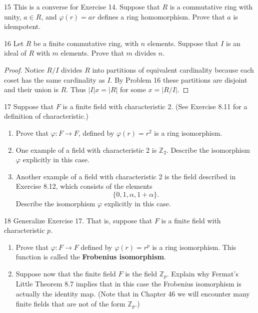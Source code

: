 \begin{problem}{15}
    This is a converse for Exercise 14. Suppose that $R$ is a commutative ring with
    unity, $a \in R$, and $\varphi(r) = ar$ defines a ring homomorphism. Prove that $a$
    is idempotent.
\end{problem}
\unsolved

\begin{problem}{16}
    Let $R$ be a finite commutative ring, with $n$ elements.
    Suppose that $I$ is an ideal of $R$ with $m$ elements.
    Prove that $m$ divides $n$.
\end{problem}
\solved

\begin{proof}
    Notice $R / I$ divides $R$ into partitions 
        of equivalent cardinality because each coset has the same cardinality as $I$.
    By Problem 16 these partitions are disjoint and their union is $R$.
    Thus $|I| x = |R|$ for some $x = |R/I|$.
\end{proof}

\begin{problem}{17}
    Suppose that $F$ is a finite field with characteristic 2. (See Exercise 8.11 for a
    definition of characteristic.)
    \begin{enumerate}
        \item[(a)] Prove that $\varphi : F \to F$, defined by $\varphi(r) = r^2$ is a ring
        isomorphism.
        \item[(b)] One example of a field with characteristic 2 is $\mathbb{Z}_2$.
        Describe the isomorphism $\varphi$ explicitly in this case.
        \item[(c)] Another example of a field with characteristic 2 is the field described
        in Exercise 8.12, which consists of the elements
        \[\{0, 1, \alpha, 1 + \alpha\}.\]
        Describe the isomorphism $\varphi$ explicitly in this case.
    \end{enumerate}
\end{problem}
\unsolved

\begin{problem}{18}
    Generalize Exercise 17. That is, suppose that $F$ is a finite field with
    characteristic $p$.
    \begin{enumerate}
        \item[(a)] Prove that $\varphi : F \to F$ defined by $\varphi(r) = r^p$ is a ring
        isomorphism. This function is called the \textbf{Frobenius isomorphism}.
        \item[(b)] Suppose now that the finite field $F$ is the field $\mathbb{Z}_p$.
        Explain why Fermat's Little Theorem 8.7 implies that in this case the Frobenius
        isomorphism is actually the identity map. (Note that in Chapter 46 we will
        encounter many finite fields that are not of the form $\mathbb{Z}_p$.)
    \end{enumerate}
\end{problem}
\unsolved
